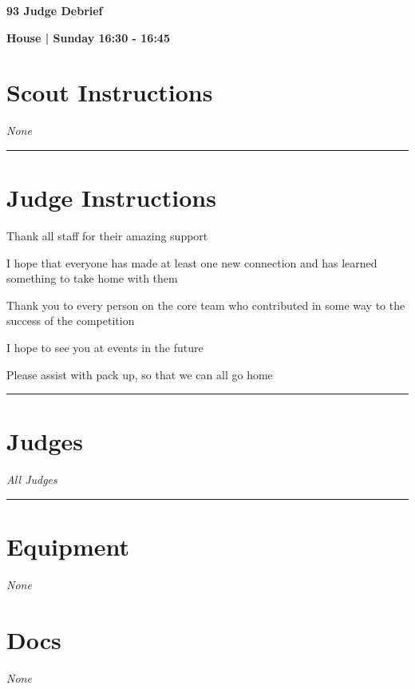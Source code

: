 \documentclass[10pt]{article}
\newcommand{\newtitle}[1]{\begin{center}{\Huge\bfseries #1 }\\ \vspace{5mm}\end{center}}
\newcommand{\newsubtitle}[1]{\begin{center}{\color{grey}\Large\bfseries #1 }\\ \vspace{5mm}\end{center}}
\begin{document}
	\vspace{1cm}


	\clearpage
		\newtitle{93 Judge Debrief }
	\newsubtitle{House | Sunday 16:30 - 16:45}
		\setcounter{section}{92}
	\section*{Scout Instructions}
		\textit{None}
	
	\vspace{0.5cm}
	\hrule
	\vspace{0.5cm}

		\section*{Judge Instructions}
		Thank all staff for their amazing support

I hope that everyone has made at least one new connection and has learned something to take home with them

Thank you to every person on the core team who contributed in some way to the success of the competition

I hope to see you at events in the future

Please assist with pack up, so that we can all go home
\vspace{0.5cm}
	\hrule
	\vspace{0.5cm}
		\section*{\faUsers \: Judges}

					\textit{All Judges}
			\vspace{0.5cm}
	\hrule
	\vspace{0.5cm}

	\begin{multicols}{2}

		\section*{\faWrench \: Equipment}

				\textit{None}
		
		\vfill\null
		\columnbreak

			\section*{\faFile \: Docs}
		 	\textit{None}
	

		\vfill\null

		\end{multicols}
\end{document}
